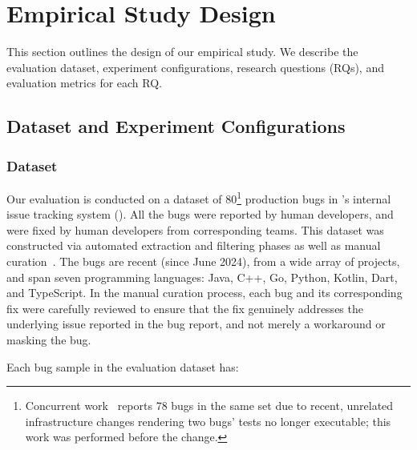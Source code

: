 \section{Empirical Study Design}
\label{sec:empiricalstudy}

This section outlines the design of our empirical study. 
We describe the evaluation dataset, experiment configurations, research questions (RQs), and evaluation metrics for each RQ.


\subsection{Dataset and Experiment Configurations}
\label{sec:empiricalstudy:datasetandconfig}

\subsubsection{Dataset}
\label{sec:empiricalstudy:datasetandconfig:dataset}
Our evaluation is conducted on a dataset of 80\footnote{Concurrent work~\cite{rondon2025passerine} reports 78 bugs in the same set due to recent, unrelated infrastructure changes rendering two bugs' tests no longer executable; this work was performed before the change.} production bugs in \google's internal issue tracking system (\gits).
All the bugs were reported by human developers, and were fixed by human developers from corresponding teams.
This dataset was constructed via automated extraction and filtering phases as well as manual curation~\cite{rondon2025passerine}. 
The bugs are recent (since June 2024), from a wide array of \google projects, and span seven programming languages: Java, C++, Go, Python, Kotlin, Dart, and TypeScript.
In the manual curation process, each bug and its corresponding fix were carefully reviewed to ensure that the fix genuinely addresses the underlying issue reported in the bug report, and not merely a workaround or masking the bug. 

Each bug sample in the evaluation dataset has:

